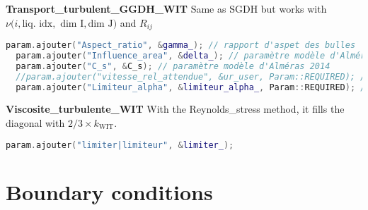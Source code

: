 \textbf{Transport_turbulent_GGDH_WIT} Same as SGDH but works with $\nu(i, \text{liq. idx},$ $\text{dim I}, \text{dim J})$ and $R_{ij}$
\begin{lstlisting}[language=c++]
  param.ajouter("Aspect_ratio", &gamma_); // rapport d'aspet des bulles
  param.ajouter("Influence_area", &delta_); // paramètre modèle d'Alméras 2014 (taille du sillage)
  param.ajouter("C_s", &C_s); // paramètre modèle d'Alméras 2014
  //param.ajouter("vitesse_rel_attendue", &ur_user, Param::REQUIRED); // valeur de ur à prendre si u_r(i,0)=0
  param.ajouter("Limiteur_alpha", &limiteur_alpha_, Param::REQUIRED); // valeur minimal de (1-alpha) pour utiliser le modèle d'Alméras
\end{lstlisting}


\textbf{Viscosite_turbulente_WIT}
With the Reynolds_stress method, it fills the diagonal with $2/3 \times k_{\text{WIT}}$.
\begin{lstlisting}[language=c++]
param.ajouter("limiter|limiteur", &limiter_);
\end{lstlisting}


\section{Boundary conditions}

